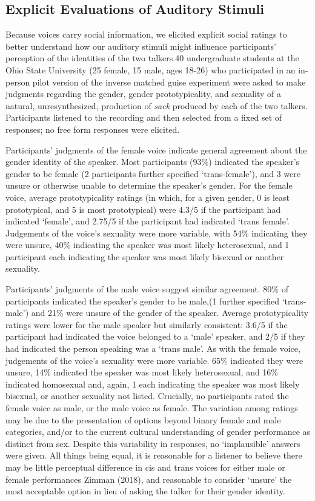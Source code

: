 \documentclass[
  letterpaper,
  DIV=11,
  numbers=noendperiod]{scrartcl}
\begin{document}
\subsection{Explicit Evaluations of Auditory
Stimuli}\label{sub-stim-evals}

Because voices carry social information, we elicited explicit social
ratings to better understand how our auditory stimuli might influence
participants' perception of the identities of the two talkers.40
undergraduate students at the Ohio State University (25 female, 15 male,
ages 18-26) who participated in an in-person pilot version of the
inverse matched guise experiment were asked to make judgments regarding
the gender, gender prototypicality, and sexuality of a natural,
unresynthesized, production of \emph{sack} produced by each of the two
talkers. Participants listened to the recording and then selected from a
fixed set of responses; no free form responses were elicited.

Participants' judgments of the female voice indicate general agreement
about the gender identity of the speaker. Most participants (93\%)
indicated the speaker's gender to be female (2 participants further
specified `trans-female'), and 3 were unsure or otherwise unable to
determine the speaker's gender. For the female voice, average
prototypicality ratings (in which, for a given gender, 0 is least
prototypical, and 5 is most prototypical) were 4.3/5 if the participant
had indicated `female', and 2.75/5 if the participant had indicated
`trans female'. Judgements of the voice's sexuality were more variable,
with 54\% indicating they were unsure, 40\% indicating the speaker was
most likely heterosexual, and 1 participant each indicating the speaker
was most likely bisexual or another sexuality.

Participants' judgments of the male voice suggest similar agreement.
80\% of participants indicated the speaker's gender to be male,(1
further specified `trans-male') and 21\% were unsure of the gender of
the speaker. Average prototypicality ratings were lower for the male
speaker but similarly consistent: 3.6/5 if the participant had indicated
the voice belonged to a `male' speaker, and 2/5 if they had indicated
the person speaking was a `trans male'. As with the female voice,
judgements of the voice's sexuality were more variable. 65\% indicated
they were unsure, 14\% indicated the speaker was most likely
heterosexual, and 16\% indicated homosexual and, again, 1 each
indicating the speaker was most likely bisexual, or another sexuality
not listed. Crucially, no participants rated the female voice as male,
or the male voice as female. The variation among ratings may be due to
the presentation of options beyond binary female and male categories,
and/or to the current cultural understanding of gender performance as
distinct from sex. Despite this variability in responses, no
`implausible' answers were given. All things being equal, it is
reasonable for a listener to believe there may be little perceptual
difference in cis and trans voices for either male or female
performances Zimman (2018), and reasonable to consider `unsure' the most
acceptable option in lieu of asking the talker for their gender
identity.
\end{document}
